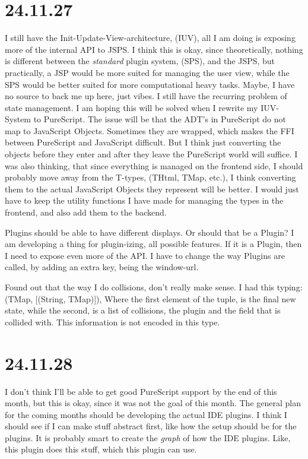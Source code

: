 \section{24.11.27}

I still have the Init-Update-View-architecture, (IUV), all I am doing is
exposing more of the internal API to JSPS. I think this is okay, since
theoretically, nothing is different between the \textit{standard} plugin system,
(SPS), and the JSPS, but practically, a JSP would be more suited for managing
the user view, while the SPS would be better suited for more computational heavy
tasks. Maybe, I have no source to back me up here, just vibes. I still have the
recurring problem of state management. I am hoping this will be solved when I
rewrite my IUV-System to PureScript. The issue will be that the ADT's in
PureScript do not map to JavaScript Objects. Sometimes they are wrapped, which
makes the FFI between PureScript and JavaScript difficult. But I think just
converting the objects before they enter and after they leave the PureScript
world will suffice. I was also thinking, that since everything is managed on
the frontend side, I should probably move away from the T-types, (THtml, TMap,
etc.), I think converting them to the actual JavaScript Objects they represent
will be better. I would just have to keep the utility functions I have made for
managing the types in the frontend, and also add them to the backend.

Plugins should be able to have different displays. Or should that be a Plugin?
I am developing a thing for plugin-izing, all possible features. If it is a
Plugin, then I need to expose even more of the API. I have to change the way
Plugins are called, by adding an extra key, being the window-url.

Found out that the way I do collisions, don't really make sense. I had this
typing: (TMap, [(String, TMap)]), Where the first element of the tuple, is the
final new state, while the second, is a list of collisions, the plugin and the
field that is collided with. This information is not encoded in this type.


\section{24.11.28}

I don't think I'll be able to get good PureScript support by the end of this
month, but this is okay, since it was not the goal of this month. The general
plan for the coming months should be developing the actual IDE plugins. I think
I should see if I can make stuff abstract first, like how the setup should be
for the plugins. It is probably smart to create the \textit{graph} of how the
IDE plugins. Like, this plugin does this stuff, which this plugin can use.


